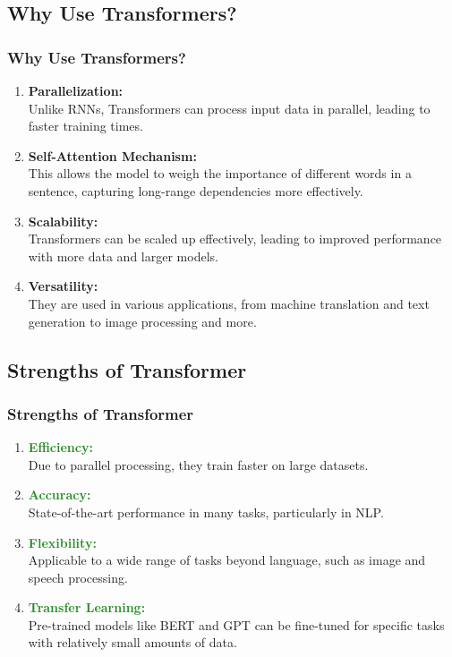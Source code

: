 \documentclass[
	12pt, %
]{beamer}
\begin{document}
\subsection{Why Use Transformers?}
\begin{frame}
	\frametitle{Why Use Transformers?}
	\begin{enumerate}
		\item
		\textbf{Parallelization:}\\ Unlike RNNs, Transformers can process input data in parallel, leading to faster training times.
		
		\item
		\textbf{Self-Attention Mechanism:}\\ This allows the model to weigh the importance of different words in a sentence, capturing long-range dependencies more effectively.
		
		\item 
		\textbf{Scalability:}\\ Transformers can be scaled up effectively, leading to improved performance with more data and larger models.
		
		\item 
		\textbf{Versatility:}\\ They are used in various applications, from machine translation and text generation to image processing and more.
	\end{enumerate}	
\end{frame}





\subsection{Strengths of Transformer}
\begin{frame}
	\frametitle{Strengths of Transformer}
	
	
	\begin{enumerate}
		\item
		\textbf{\textcolor{ForestGreen}{Efficiency:}}\\ Due to parallel processing, they train faster on large datasets.
		
		\item
		\textbf{\textcolor{ForestGreen}{Accuracy:}}\\ State-of-the-art performance in many tasks, particularly in NLP.
		
		\item 
		\textbf{\textcolor{ForestGreen}{Flexibility:}}\\ Applicable to a wide range of tasks beyond language, such as image and speech processing.
		
		\item 
		\textbf{\textcolor{ForestGreen}{Transfer Learning:}}\\ Pre-trained models like BERT and GPT can be fine-tuned for specific tasks with relatively small amounts of data.
	\end{enumerate}
\end{frame}
\end{document}

